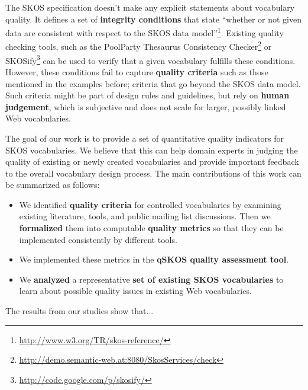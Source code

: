 
The SKOS specification doesn't make any explicit statements about vocabulary quality. It defines a set of \textbf{integrity conditions} that state ``whether or not given data are consistent with respect to the SKOS data model''\footnote{\url{http://www.w3.org/TR/skos-reference/}}. Existing quality checking tools, such as the PoolParty Thesaurus Consistency Checker\footnote{\url{http://demo.semantic-web.at:8080/SkosServices/check}} or SKOSify\footnote{\url{http://code.google.com/p/skosify/}} can be used to verify that a given vocabulary fulfills these conditions. However, these conditions fail to capture \textbf{quality criteria} such as those mentioned in the examples before; criteria that go beyond the SKOS data model. Such criteria might be part of design rules and guidelines, but rely on \textbf{human judgement}, which is subjective and does not scale for larger, possibly linked Web vocabularies.


The goal of our work is to provide a set of quantitative quality indicators for SKOS vocabularies. We believe that this can help domain experts in judging the quality of existing or newly created vocabularies and provide important feedback to the overall vocabulary design process. The main contributions of this work can be summarized as follows:

\begin{itemize}

	\item We identified \textbf{quality criteria} for controlled vocabularies by examining existing literature, tools, and public mailing list discussions. Then we \textbf{formalized} them into computable \textbf{quality metrics} so that they can be implemented consistently by different tools.
	
	\item We implemented these metrics in the \textbf{qSKOS quality assessment tool}.

	\item We \textbf{analyzed} a representative \textbf{set of existing SKOS vocabularies} to learn about possible quality issues in existing Web vocabularies.

\end{itemize}

The results from our studies show that... 
